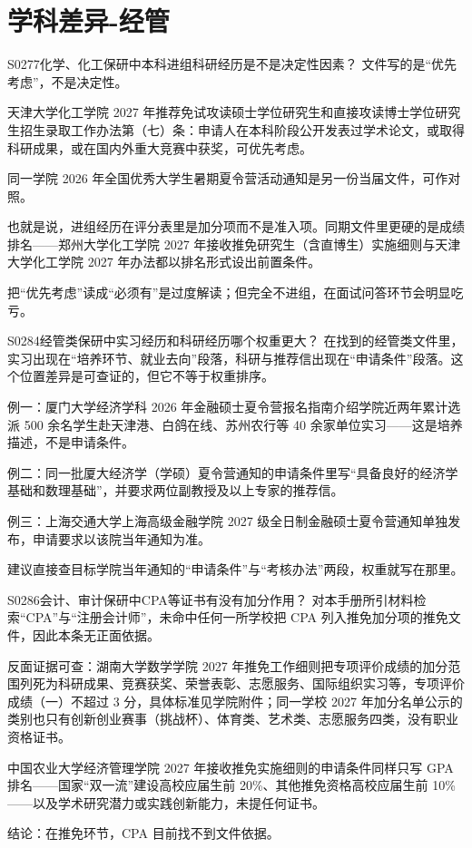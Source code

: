 \section{学科差异-经管}
\begin{qa}{S0277}{化学、化工保研中本科进组科研经历是不是决定性因素？}
文件写的是“优先考虑”，不是决定性。

天津大学化工学院 2027 年推荐免试攻读硕士学位研究生和直接攻读博士学位研究生招生录取工作办法第（七）条：申请人在本科阶段公开发表过学术论文，或取得科研成果，或在国内外重大竞赛中获奖，可优先考虑。

同一学院 2026 年全国优秀大学生暑期夏令营活动通知是另一份当届文件，可作对照。

也就是说，进组经历在评分表里是加分项而不是准入项。同期文件里更硬的是成绩排名——郑州大学化工学院 2027 年接收推免研究生（含直博生）实施细则与天津大学化工学院 2027 年办法都以排名形式设出前置条件。

把“优先考虑”读成“必须有”是过度解读；但完全不进组，在面试问答环节会明显吃亏。
\end{qa}

\begin{qa}{S0284}{经管类保研中实习经历和科研经历哪个权重更大？}
在找到的经管类文件里，实习出现在“培养环节、就业去向”段落，科研与推荐信出现在“申请条件”段落。这个位置差异是可查证的，但它不等于权重排序。

例一：厦门大学经济学科 2026 年金融硕士夏令营报名指南介绍学院近两年累计选派 500 余名学生赴天津港、白鸽在线、苏州农行等 40 余家单位实习——这是培养描述，不是申请条件。

例二：同一批厦大经济学（学硕）夏令营通知的申请条件里写“具备良好的经济学基础和数理基础”，并要求两位副教授及以上专家的推荐信。

例三：上海交通大学上海高级金融学院 2027 级全日制金融硕士夏令营通知单独发布，申请要求以该院当年通知为准。

建议直接查目标学院当年通知的“申请条件”与“考核办法”两段，权重就写在那里。
\end{qa}

\begin{qa}{S0286}{会计、审计保研中CPA等证书有没有加分作用？}
对本手册所引材料检索“CPA”与“注册会计师”，未命中任何一所学校把 CPA 列入推免加分项的推免文件，因此本条无正面依据。

反面证据可查：湖南大学数学学院 2027 年推免工作细则把专项评价成绩的加分范围列死为科研成果、竞赛获奖、荣誉表彰、志愿服务、国际组织实习等，专项评价成绩（一）不超过 3 分，具体标准见学院附件；同一学校 2027 年加分名单公示的类别也只有创新创业赛事（挑战杯）、体育类、艺术类、志愿服务四类，没有职业资格证书。

中国农业大学经济管理学院 2027 年接收推免实施细则的申请条件同样只写 GPA 排名——国家“双一流”建设高校应届生前 20\%、其他推免资格高校应届生前 10\%——以及学术研究潜力或实践创新能力，未提任何证书。

结论：在推免环节，CPA 目前找不到文件依据。
\end{qa}

